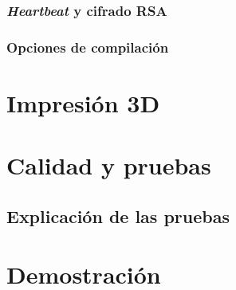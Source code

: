 \subsection{\textit{Heartbeat} y cifrado RSA}

\subsection{Opciones de compilación}


\chapter{Impresión 3D}

% 
% 
% 

\chapter{Calidad y pruebas}

% 
\section{Explicación de las pruebas}

%
%

\chapter{Demostración}


